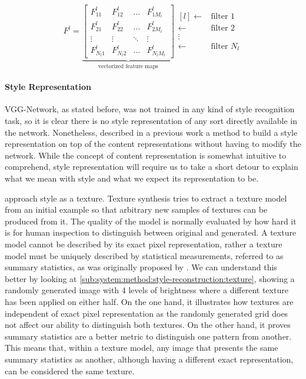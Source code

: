 \begin{equation}
  F^l =
  \underbrace{
    \begin{bmatrix}
      F^l_{11}   & F^l_{12}   & \dots  & F^l_{1M_l} \\
      F^l_{21}   & F^l_{22}   & \dots  & F^l_{2M_l} \\
      \vdots     & \vdots     & \ddots & \vdots   \\
      F^l_{N_l1} & F^l_{N_l2} & \dots  & F^l_{N_lM_l}
    \end{bmatrix}
  }_{\text{vectorized feature maps}}
  \begin{matrix*}[l]
    \leftarrow & \text{filter } 1 \\
    \leftarrow & \text{filter } 2 \\
    \vdots                     \\
    \leftarrow & \text{filter } N_l
  \end{matrix*}
\end{equation}

\paragraph{Style Representation}
VGG-Network, as stated before, was not trained in any kind of style recognition task, so it is clear there is no style representation of any sort directly available in the network.
Nonetheless, \citeauthor{Gatys2015A} described in a previous work \cite{Gatys2015A} a method to build a style representation on top of the content representations without having to modify the network.
While the concept of content representation is somewhat intuitive to comprehend, style representation will require us to take a short detour to explain what we mean with style and what we expect its representation to be.

\citeauthor{Gatys2015A} approach style as a texture.
Texture synthesis tries to extract a texture model from an initial example so that arbitrary new samples of textures can be produced from it.
The quality of the model is normally evaluated by how hard it is for human inspection to distinguish between original and generated.
A texture model cannot be described by its exact pixel representation, rather a texture model must be uniquely described by statistical measurements, referred to as summary statistics, as was originally proposed by \citet{Julesz1962}.
We can understand this better by looking at \autoref{sub:system:method:style-reconstruction:texture}, showing a randomly generated image with 4 levels of brightness where a different texture has been applied on either half.
On the one hand, it illustrates how textures are independent of exact pixel representation as the randomly generated grid does not affect our ability to distinguish both textures.
On the other hand, it proves summary statistics are a better metric to distinguish one pattern from another.
This means that, within a texture model, any image that presents the same summary statistics as another, although having a different exact representation, can be considered the same texture.

